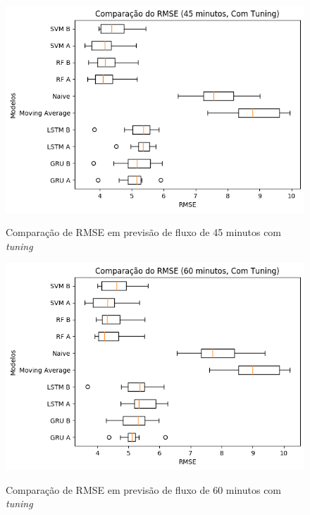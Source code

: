 \begin{figure}[htbp]
    \centering
    \includegraphics[scale=0.8]{monography/img/snapshots/comparacao_do_rmse_(45_minutos,_com_tuning)_performance_boxes.png}
    \label{figure:comparacao_previsao_rmse_45_com_tuning}
    \caption{Comparação de RMSE em previsão de fluxo de 45 minutos com \textit{tuning}}
\end{figure}

\begin{figure}[htbp]
    \centering
    \includegraphics[scale=0.8]{monography/img/snapshots/comparacao_do_rmse_(60_minutos,_com_tuning)_performance_boxes.png}
    \label{figure:comparacao_previsao_rmse_60_com_tuning}
    \caption{Comparação de RMSE em previsão de fluxo de 60 minutos com \textit{tuning}}
\end{figure}

